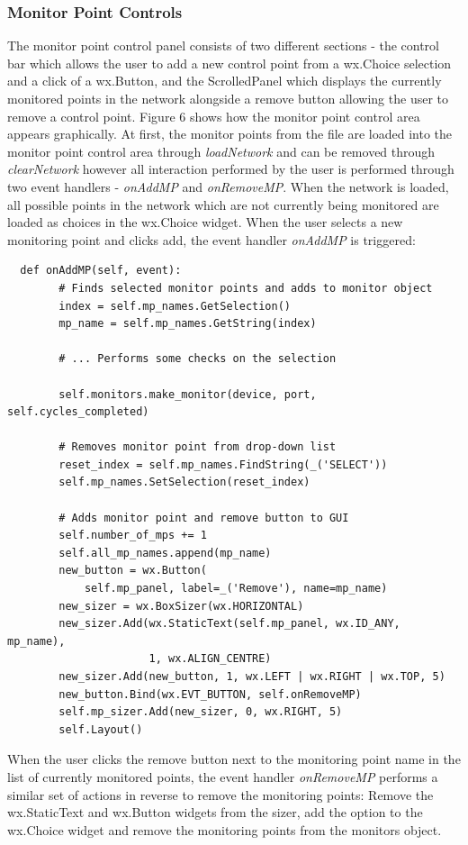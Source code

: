 \documentclass{article}					%
\begin{document}
\subsubsection{Monitor Point Controls}
The monitor point control panel consists of two different sections - the control bar which allows the user to add a new control point from a wx.Choice selection and a click of a wx.Button, and the ScrolledPanel which displays the currently monitored points in the network alongside a remove button allowing the user to remove a control point. Figure 6 shows how the monitor point control area appears graphically. At first, the monitor points from the file are loaded into the monitor point control area through \textit{loadNetwork} and can be removed through \textit{clearNetwork} however all interaction performed by the user is performed through two event handlers - \textit{onAddMP} and \textit{onRemoveMP}. When the network is loaded, all possible points in the network which are not currently being monitored are loaded as choices in the wx.Choice widget. When the user selects a new monitoring point and clicks add, the event handler \textit{onAddMP} is triggered:
\begin{verbatim}
  def onAddMP(self, event):
        # Finds selected monitor points and adds to monitor object
        index = self.mp_names.GetSelection()
        mp_name = self.mp_names.GetString(index)

        # ... Performs some checks on the selection

        self.monitors.make_monitor(device, port, self.cycles_completed)

        # Removes monitor point from drop-down list
        reset_index = self.mp_names.FindString(_('SELECT'))
        self.mp_names.SetSelection(reset_index)

        # Adds monitor point and remove button to GUI
        self.number_of_mps += 1
        self.all_mp_names.append(mp_name)
        new_button = wx.Button(
            self.mp_panel, label=_('Remove'), name=mp_name)
        new_sizer = wx.BoxSizer(wx.HORIZONTAL)
        new_sizer.Add(wx.StaticText(self.mp_panel, wx.ID_ANY, mp_name),
                      1, wx.ALIGN_CENTRE)
        new_sizer.Add(new_button, 1, wx.LEFT | wx.RIGHT | wx.TOP, 5)
        new_button.Bind(wx.EVT_BUTTON, self.onRemoveMP)
        self.mp_sizer.Add(new_sizer, 0, wx.RIGHT, 5)
        self.Layout()
\end{verbatim}
When the user clicks the remove button next to the monitoring point name in the list of currently monitored points, the event handler \textit{onRemoveMP} performs a similar set of actions in reverse to remove the monitoring points: Remove the wx.StaticText and wx.Button widgets from the sizer, add the option to the wx.Choice widget and remove the monitoring points from the monitors object.
\end{document}
